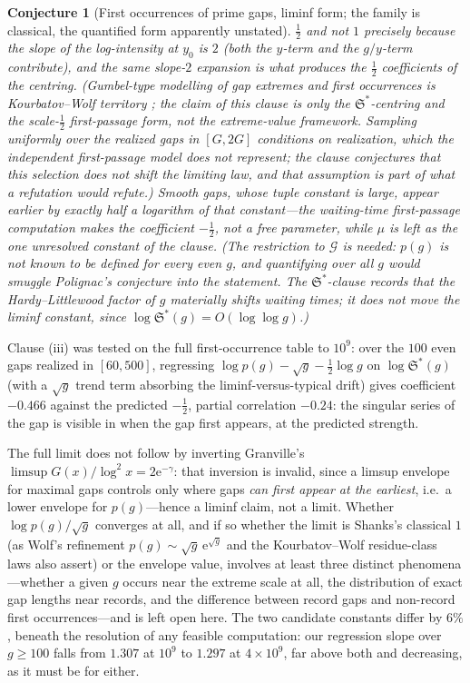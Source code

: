 \documentclass[11pt]{article}
\newtheorem{conjecture}{Conjecture}
\theoremstyle{definition}
\newcommand{\e}{\mathrm{e}}
\newcommand{\SG}{\mathfrak S}
\begin{document}
\begin{conjecture}[First occurrences of prime gaps, liminf form; the
family is classical, the quantified form apparently
unstated]
$\tfrac12$ and not $1$ precisely because the slope of the
log-intensity at $y_0$ is $2$ (both the $y$-term and the $g/y$-term
contribute), and the same slope-$2$ expansion is what produces the
$\tfrac12$ coefficients of the centring.  (Gumbel-type modelling of gap
extremes and first occurrences is Kourbatov--Wolf territory
\cite{Kourbatov,KW2020}; the claim of this clause is only the
$\SG^{*}$-centring and the scale-$\tfrac12$ first-passage form,
not the extreme-value framework.  Sampling uniformly
over the \emph{realized}
gaps in
$[G,2G]$ conditions on realization, which the independent
first-passage model does not represent; the clause conjectures that
this selection does not shift the limiting law, and that assumption
is part of what a refutation would refute.)  Smooth
gaps, whose tuple constant is large, appear \emph{earlier} by exactly
half a logarithm of that constant---the waiting-time first-passage
computation makes the coefficient $-\tfrac12$, not a free parameter,
while $\mu$ is left as the one unresolved constant of the clause.  (The
restriction to $\mathcal G$ is needed: $p(g)$ is not known
to be defined for every even $g$, and quantifying over all $g$ would
smuggle Polignac's conjecture into the statement.  The
$\SG^{*}$-clause records that the Hardy--Littlewood factor of $g$
materially shifts waiting times; it does not move the liminf constant,
since $\log\SG^{*}(g)=O(\log\log g)$.)
\end{conjecture}

Clause (iii) was tested on the full first-occurrence table to $10^9$:
over the $100$ even gaps realized in $[60,500]$, regressing
$\log p(g)-\sqrt g-\tfrac12\log g$ on $\log\SG^{*}(g)$ (with a
$\sqrt g$ trend term absorbing the liminf-versus-typical drift) gives
coefficient $-0.466$ against the predicted $-\tfrac12$, partial
correlation $-0.24$: the singular series of the gap is visible in
when the gap first appears, at the predicted strength.

The full limit does not follow by inverting Granville's
$\limsup G(x)/\log^2x=2\e^{-\gamma}$: that inversion is invalid, since
a limsup envelope for maximal gaps controls only where gaps \emph{can
first appear at the earliest}, i.e.\ a lower envelope for
$p(g)$---hence a liminf claim, not a limit.
Whether $\log p(g)/\sqrt g$ converges at all, and if so whether the
limit is Shanks's classical $1$ \cite{Shanks} (as Wolf's refinement
$p(g)\sim\sqrt g\,\e^{\sqrt g}$ and the Kourbatov--Wolf residue-class
laws \cite{KW2020} also assert) or the envelope value, involves at
least three distinct phenomena---whether a given $g$ occurs near the
extreme scale at all, the distribution of exact gap lengths near
records, and the difference between record gaps and non-record first
occurrences---and is left open here.  The two candidate constants
differ by $6\%$, beneath the resolution of any feasible computation:
our regression slope over $g\ge100$ falls from $1.307$ at $10^9$ to
$1.297$ at $4\times10^9$, far above both and decreasing, as it must be
for either.
\end{document}
